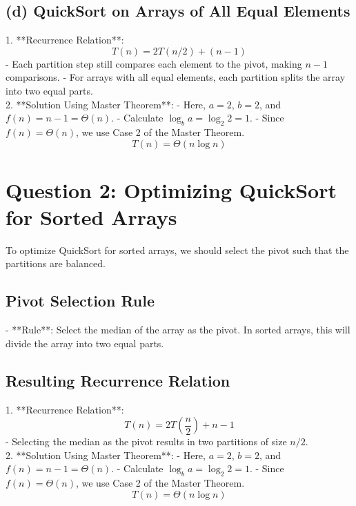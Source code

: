 \documentclass{article}
\begin{document}
\subsection*{(d) QuickSort on Arrays of All Equal Elements}
1. **Recurrence Relation**:
   \[
   T(n) = 2T(n/2) + (n-1)
   \]
   - Each partition step still compares each element to the pivot, making $n-1$ comparisons.
   - For arrays with all equal elements, each partition splits the array into two equal parts.\\
2. **Solution Using Master Theorem**:
   - Here, $a = 2$, $b = 2$, and $f(n) = n - 1 = \Theta(n)$.
   - Calculate $\log_b{a} = \log_2{2} = 1$.
   - Since $f(n) = \Theta(n)$, we use Case 2 of the Master Theorem.
   \[
   T(n) = \Theta(n \log n)
   \]

\section*{Question 2: Optimizing QuickSort for Sorted Arrays}

To optimize QuickSort for sorted arrays, we should select the pivot such that the partitions are balanced.

\subsection*{Pivot Selection Rule}
- **Rule**: Select the median of the array as the pivot. In sorted arrays, this will divide the array into two equal parts.

\subsection*{Resulting Recurrence Relation}
1. **Recurrence Relation**:
   \[
   T(n) = 2T\left(\frac{n}{2}\right) + n - 1
   \]
   - Selecting the median as the pivot results in two partitions of size $n/2$.\\
2. **Solution Using Master Theorem**:
   - Here, $a = 2$, $b = 2$, and $f(n) = n - 1 = \Theta(n)$.
   - Calculate $\log_b{a} = \log_2{2} = 1$.
   - Since $f(n) = \Theta(n)$, we use Case 2 of the Master Theorem.
   \[
   T(n) = \Theta(n \log n)
   \]
\end{document}
